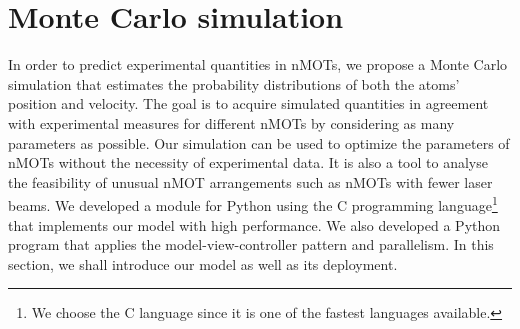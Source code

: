 %
\chapter{Monte Carlo simulation}
\label{ch:Monte-Carlo-simulation}
%

In order to predict experimental quantities in nMOTs, we propose a Monte Carlo simulation that estimates the probability distributions of both the atoms' position and velocity. The goal is to acquire simulated quantities in agreement with experimental measures for different nMOTs by considering as many parameters as possible. Our simulation can be used to optimize the parameters of nMOTs without the necessity of experimental data. It is also a tool to analyse the feasibility of unusual nMOT arrangements such as nMOTs with fewer laser beams. We developed a module for Python using the C programming language\footnote{We choose the C language since it is one of the fastest languages available.} that implements our model with high performance. We also developed a Python program that applies the model-view-controller pattern and parallelism. In this section, we shall introduce our model as well as its deployment.


%


%
